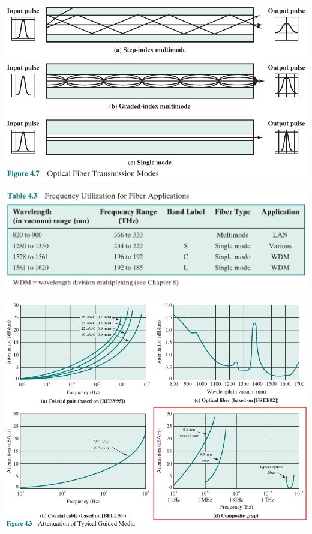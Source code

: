 \documentclass[pdflatex,compress]{beamer}
\begin{document}
\begin{frame}
	\begin{center}
		\includegraphics[width=\linewidth]{img/img15}
	\end{center}
\end{frame}

\begin{frame}
	\begin{center}
		\includegraphics[width=\linewidth]{img/img16}
	\end{center}
\end{frame}

\begin{frame}
	\begin{center}
		\includegraphics[height=0.9\textheight]{img/img17}
	\end{center}
\end{frame}
\end{document}
